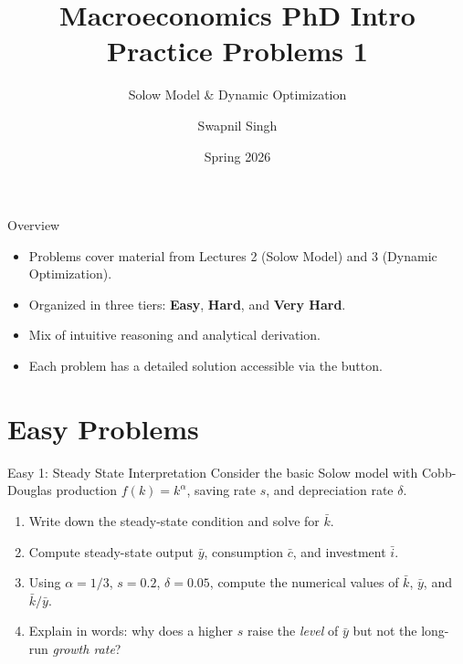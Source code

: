 \documentclass[aspectratio=169,10pt]{beamer}
\title{Macroeconomics PhD Intro\\Practice Problems 1}
\subtitle{Solow Model \& Dynamic Optimization}
\author{Swapnil Singh}
\institute{Lietuvos Bankas \and Kaunas University of Technology}
\date{Spring 2026}
\newcommand{\apxbutton}[1]{\hfill\hyperlink{#1}{\beamerbutton{Solution}}}
\begin{document}
\begin{frame}
  \titlepage
\end{frame}

\begin{frame}{Overview}
\begin{itemize}
  \item Problems cover material from Lectures 2 (Solow Model) and 3 (Dynamic Optimization).
  \item Organized in three tiers: \textbf{Easy}, \textbf{Hard}, and \textbf{Very Hard}.
  \item Mix of intuitive reasoning and analytical derivation.
  \item Each problem has a detailed solution accessible via the  button.
\end{itemize}
\end{frame}


\section{Easy Problems}

\begin{frame}{Easy 1: Steady State Interpretation}
\hypertarget{q-e1}{}
Consider the basic Solow model with Cobb-Douglas production $f(k)=k^\alpha$, saving rate $s$, and depreciation rate $\delta$.

\begin{enumerate}
  \item Write down the steady-state condition and solve for $\bar{k}$.
  \item Compute steady-state output $\bar{y}$, consumption $\bar{c}$, and investment $\bar{i}$.
  \item Using $\alpha=1/3$, $s=0.2$, $\delta=0.05$, compute the numerical values of $\bar{k}$, $\bar{y}$, and $\bar{k}/\bar{y}$.
  \item Explain in words: why does a higher $s$ raise the \emph{level} of $\bar{y}$ but not the long-run \emph{growth rate}?
\end{enumerate}
\apxbutton{s-e1}
\end{frame}
\end{document}

